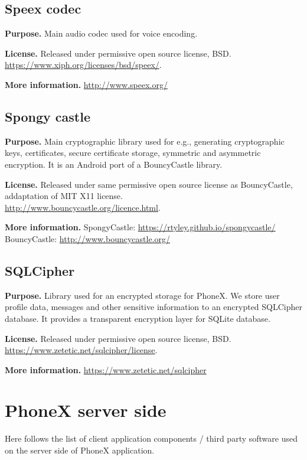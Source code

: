 \documentclass[a4paper,10pt]{article}
\begin{document}
\subsection{Speex codec}
\par\smallskip\noindent\textbf{Purpose.} Main audio codec used for voice encoding.
\par\smallskip\noindent\textbf{License.} Released under permissive open source license, BSD. \\ \url{https://www.xiph.org/licenses/bsd/speex/}.
\par\smallskip\noindent\textbf{More information.}  \url{http://www.speex.org/}

\subsection{Spongy castle}
\par\smallskip\noindent\textbf{Purpose.} Main cryptographic library used for e.g., generating cryptographic keys, certificates, secure certificate storage, 
symmetric and asymmetric encryption. It is an Android port of a BouncyCastle library.
\par\smallskip\noindent\textbf{License.} Released under same permissive open source license as BouncyCastle, addaptation of MIT X11 license. \\ \url{http://www.bouncycastle.org/licence.html}.
\par\smallskip\noindent\textbf{More information.}  SpongyCastle: \url{https://rtyley.github.io/spongycastle/} \quad BouncyCastle: \url{http://www.bouncycastle.org/}

\subsection{SQLCipher}
\par\smallskip\noindent\textbf{Purpose.} Library used for an encrypted storage for PhoneX. We store user profile data, messages and other sensitive information 
to an encrypted SQLCipher database. It provides a transparent encryption layer for SQLite database.
\par\smallskip\noindent\textbf{License.} Released under permissive open source license, BSD. \\ \url{https://www.zetetic.net/sqlcipher/license}.
\par\smallskip\noindent\textbf{More information.}  \url{https://www.zetetic.net/sqlcipher}


\section{PhoneX server side}
Here follows the list of client application components / third party software used on the server side of PhoneX application.
\end{document}

